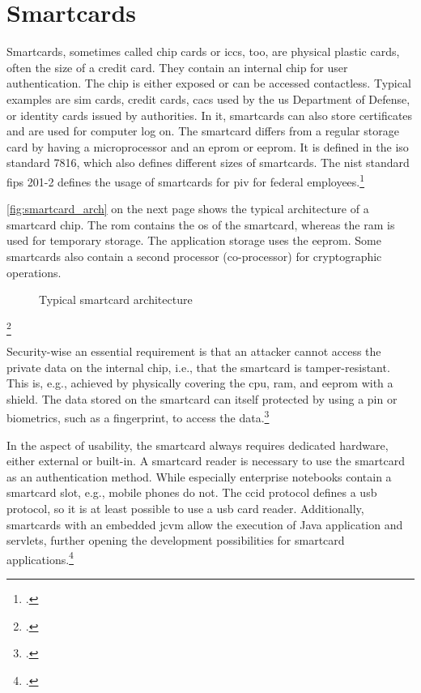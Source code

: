 \section{Smartcards}

Smartcards, sometimes called chip cards or \glspl{icc}, too, are physical plastic cards, often the size of a credit card. They contain an internal chip for user authentication. The chip is either exposed or can be accessed contactless. Typical examples are \gls{sim} cards, credit cards, \glspl{cac} used by the \gls{us} Department of Defense, or identity cards issued by authorities. In \gls{it}, smartcards can also store certificates and are used for computer log on. The smartcard differs from a regular storage card by having a microprocessor and an \gls{eprom} or \gls{eeprom}. It is defined in the \gls{iso} standard 7816, which also defines different sizes of smartcards. The \gls{nist} standard \gls{fips} 201-2 defines the usage of smartcards for \gls{piv} for federal employees.\footcites[See][525--527]{eckert-it-sec-9}[See][]{iso7816}[See][6--9]{Mayes2017}[See][]{FIPS201-2}

\autoref{fig:smartcard_arch} on the next page shows the typical architecture of a smartcard chip. The \gls{rom} contains the \gls{os} of the smartcard, whereas the \gls{ram} is used for temporary storage. The application storage uses the \gls{eeprom}. Some smartcards also contain a second processor (co-processor) for cryptographic operations.

\newpage

\begin{figure}[hbt]
	\centering
	
	\caption[Typical smartcard architecture]{Typical smartcard architecture\footnotemark}
	\label{fig:smartcard_arch}
\end{figure}
\footcitetexts[Source: diagram by author, based on][33]{electronic_certification_mobile_devices}[][228]{Tunstall2017}

Security-wise an essential requirement is that an attacker cannot access the private data on the internal chip, i.e., that the smartcard is tamper-resistant. This is, e.g., achieved by physically covering the \gls{cpu}, \gls{ram}, and \gls{eeprom} with a shield. The data stored on the smartcard can itself protected by using a \gls{pin} or biometrics, such as a fingerprint, to access the data.\footcites[See][34]{265831}[See][228]{Tunstall2017}

In the aspect of usability, the smartcard always requires dedicated hardware, either external or built-in. A smartcard reader is necessary to use the smartcard as an authentication method. While especially enterprise notebooks contain a smartcard slot, e.g., mobile phones do not. The \gls{ccid} protocol defines a \gls{usb} protocol, so it is at least possible to use a \gls{usb} card reader. Additionally, smartcards with an embedded \gls{jcvm} allow the execution of Java application and servlets, further opening the development possibilities for smartcard applications.\footcites[See][65]{Markantonakis2017}[See][539]{eckert-it-sec-9}
